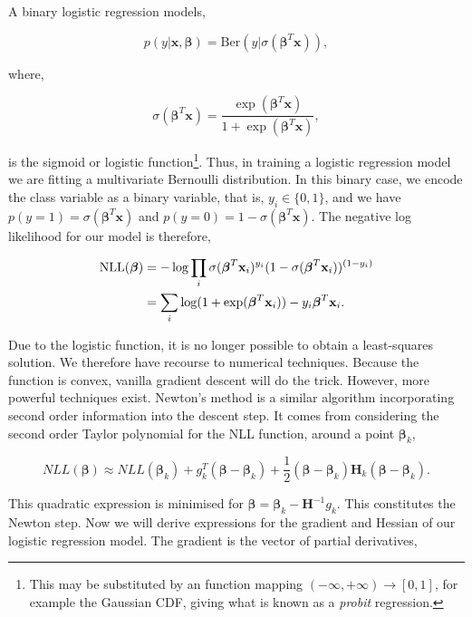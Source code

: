 \documentclass[11pt]{amsart}
\begin{document}
A binary logistic regression models,

$$p(y|\mathbf{x}, \boldsymbol\beta) = \text{Ber}(y|\sigma(\boldsymbol\beta^T\mathbf{x})),$$

where,

$$\sigma(\boldsymbol\beta^T\mathbf{x}) = \frac{\exp(\boldsymbol\beta^T\mathbf{x})}{1 + \exp(\boldsymbol\beta^T\mathbf{x})},$$

is the sigmoid or logistic function\footnote{This may be substituted by an function mapping $(-\infty, +\infty) \to [0, 1]$, for example the Gaussian CDF, giving what is known as a \emph{probit} regression.}. Thus, in training a logistic regression model we are fitting a multivariate Bernoulli distribution. In this binary case, we encode the class variable as a binary variable, that is, $y_i \in \{0, 1\}$, and we have $p(y = 1) = \sigma(\boldsymbol\beta^T\mathbf{x})$ and $p(y = 0) = 1 - \sigma(\boldsymbol\beta^T\mathbf{x})$. The negative log likelihood for our model is therefore,

\begin{align}
\text{NLL}(\boldsymbol\beta) &= -\log\prod_i \sigma(\boldsymbol\beta^T\mathbf{x}_i)^{y_i}(1 - \sigma(\boldsymbol\beta^T\mathbf{x}_i))^{(1 - y_i)} \notag \\
&= \sum_i \log(1 + \exp(\boldsymbol\beta^T\mathbf{x}_i)) - y_i\boldsymbol\beta^T\mathbf{x}_i.\notag
\end{align}

Due to the logistic function, it is no longer possible to obtain a least-squares solution. We therefore have recourse to numerical techniques. Because the function is convex, vanilla gradient descent will do the trick. However, more powerful techniques exist. Newton's method is a similar algorithm incorporating second order information into the descent step. It comes from considering the second order Taylor polynomial for the NLL function, around a point $\boldsymbol\beta_k$,

$$NLL(\boldsymbol\beta) \approx NLL(\boldsymbol\beta_k) + g_k^T(\boldsymbol\beta - \boldsymbol\beta_k) + \frac{1}{2}(\boldsymbol\beta - \boldsymbol\beta_k)\mathbf{H}_k(\boldsymbol\beta - \boldsymbol\beta_k).$$

This quadratic expression is minimised for $\boldsymbol\beta = \boldsymbol\beta_k - \mathbf{H}^{-1}g_k$. This constitutes the Newton step. Now we will derive expressions for the gradient and Hessian of our logistic regression model. The gradient is the vector of partial derivatives,
\end{document}
